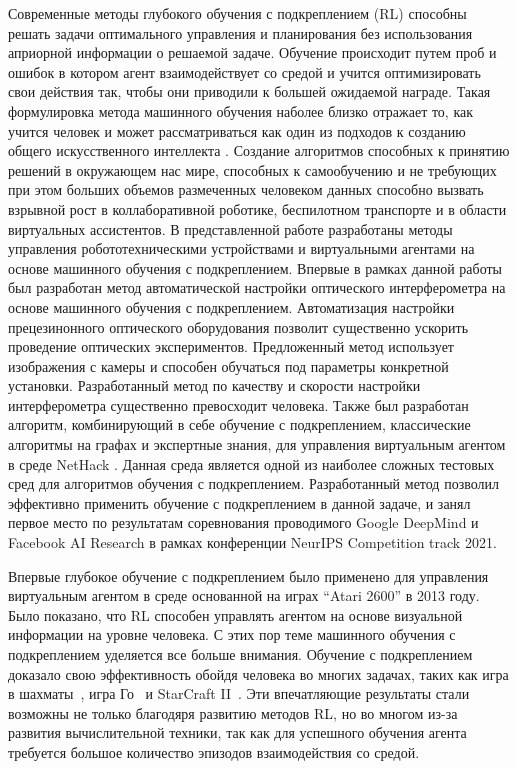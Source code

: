 Современные методы глубокого обучения с подкреплением (RL) способны решать задачи оптимального управления и планирования без использования априорной информации о решаемой задаче. Обучение происходит путем проб и ошибок в котором агент взаимодействует со средой и учится оптимизировать свои действия так, чтобы они приводили к большей ожидаемой награде. Такая формулировка метода машинного обучения наболее близко отражает то, как учится человек и может рассматриваться как один из подходов к созданию общего искусственного интеллекта \cite{reward_is_enough}. Создание алгоритмов способных к принятию решений в окружающем нас мире, способных к самообучению и не требующих при этом больших объемов размеченных человеком данных способно вызвать взрывной рост в коллаборативной роботике, беспилотном транспорте и в области виртуальных ассистентов. В представленной работе разработаны методы управления робототехническими устройствами и виртуальными агентами на основе машинного обучения с подкреплением. Впервые в рамках данной работы был разработан метод автоматической настройки оптического интерферометра на основе машинного обучения с подкреплением. Автоматизация настройки прецезинонного оптического оборудования позволит существенно ускорить проведение оптических экспериментов. Предложенный метод использует изображения с камеры и способен обучаться под параметры конкретной установки. Разработанный метод по качеству и скорости настройки интерферометра существенно превосходит человека. Также был разработан алгоритм, комбинирующий в себе обучение с подкреплением, классические алгоритмы на графах и экспертные знания, для управления виртуальным агентом в среде NetHack \cite{nethack}. Данная среда является одной из наиболее сложных тестовых сред для алгоритмов обучения с подкреплением. Разработанный метод позволил эффективно применить обучение с подкреплением в данной задаче, и занял первое место по результатам соревнования проводимого Google DeepMind и Facebook AI Research в рамках конференции NeurIPS Competition track 2021. 


{\actuality} Впервые глубокое обучение с подкреплением было применено для управления виртуальным агентом в среде основанной на играх ``Atari 2600'' в 2013 году\cite{mnih2013atari}. Было показано, что RL способен управлять агентом на основе визуальной информации на уровне человека. С этих пор теме машинного обучения с подкреплением уделяется все больше внимания. Обучение с подкреплением доказало свою эффективность обойдя человека во многих задачах, таких как игра в шахматы~\cite{alphazero}, игра Го~\cite{alphago} и StarCraft II~\cite{alphastar}. Эти впечатляющие результаты стали возможны не только благодяря развитию методов RL, но во многом из-за развития вычислительной техники, так как для успешного обучения агента требуется большое количество эпизодов взаимодействия со средой. 

